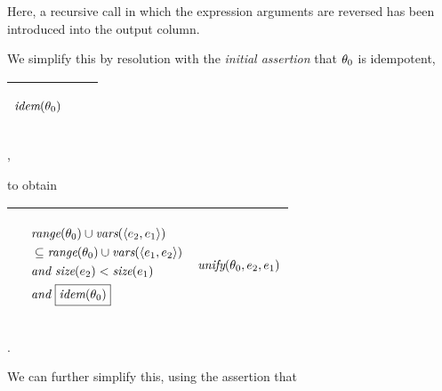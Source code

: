 \documentclass[runningheads]{llncs}
\DeclareMathOperator{\uand}{\emph{and}\,}
\DeclareMathOperator{\unify}{\emph{unify}}
\DeclareMathOperator{\idem}{\emph{idem}}
\begin{document}
Here, a recursive call in which the expression arguments are reversed has been introduced into the output column.


We simplify this by resolution with the \emph{initial assertion} that $\theta_{0}$ is idempotent,
\begin{center}
\begin{tabularx}{1.0\textwidth} { 
  | >{\raggedright\arraybackslash}X 
  | >{\raggedright\arraybackslash}X 
  || >{\raggedright\arraybackslash}X | }
 \hline 
\vspace{-.3cm}\begin{center}$\idem(\thet{0} )$\end{center} &  & \\
\hline
\end{tabularx},
\end{center}
to obtain
\begin{center}
\begin{tabular}{|m{}|m{}||m{}|}
 \hline 
  & 
 \begin{center}
{$\begin{aligned}
 &\begin{aligned}
  &\,\range(\thet{0}) \cup \vars(\langle \e{2}, \e{1}\rangle ) \\ 
  &\,  \subseteq \range(\thet{0}) \cup \vars( \langle \e{1}, \e{2}\rangle )  \\
  & \uand \size(\e{2}) < \size(\e{1})
\end{aligned}  \\
& \uand \boxed{\idem(\thet{0})} 
 \end{aligned} $}
\end{center}
& 
\begin{center}$\unify(\thet{0}, \e{2}, \e{1})$ \end{center}\\
\hline
\end{tabular}.
\end{center} 
We can further simplify this, using the assertion that
 
\end{document}
